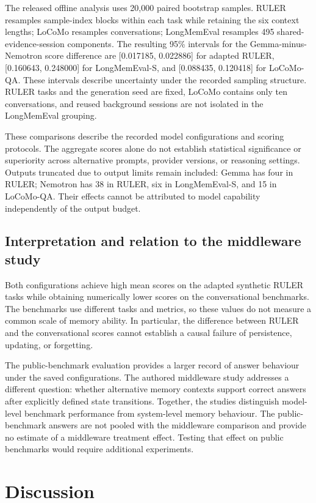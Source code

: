 \documentclass[11pt,a4paper]{article}
\begin{document}
The released offline analysis uses 20,000 paired bootstrap samples. RULER resamples sample-index blocks within each task while retaining the six context lengths; LoCoMo resamples conversations; LongMemEval resamples 495 shared-evidence-session components. The resulting 95\% intervals for the Gemma-minus-Nemotron score difference are [0.017185, 0.022886] for adapted RULER, [0.160643, 0.248000] for LongMemEval-S, and [0.088435, 0.120418] for LoCoMo-QA. These intervals describe uncertainty under the recorded sampling structure. RULER tasks and the generation seed are fixed, LoCoMo contains only ten conversations, and reused background sessions are not isolated in the LongMemEval grouping.

These comparisons describe the recorded model configurations and scoring protocols. The aggregate scores alone do not establish statistical significance or superiority across alternative prompts, provider versions, or reasoning settings. Outputs truncated due to output limits remain included: Gemma has four in RULER; Nemotron has 38 in RULER, six in LongMemEval-S, and 15 in LoCoMo-QA. Their effects cannot be attributed to model capability independently of the output budget.

\subsection{Interpretation and relation to the middleware study}
Both configurations achieve high mean scores on the adapted synthetic RULER tasks while obtaining numerically lower scores on the conversational benchmarks. The benchmarks use different tasks and metrics, so these values do not measure a common scale of memory ability. In particular, the difference between RULER and the conversational scores cannot establish a causal failure of persistence, updating, or forgetting.

The public-benchmark evaluation provides a larger record of answer behaviour under the saved configurations. The authored middleware study addresses a different question: whether alternative memory contexts support correct answers after explicitly defined state transitions. Together, the studies distinguish model-level benchmark performance from system-level memory behaviour. The public-benchmark answers are not pooled with the middleware comparison and provide no estimate of a middleware treatment effect. Testing that effect on public benchmarks would require additional experiments.

\section{Discussion}
\end{document}
